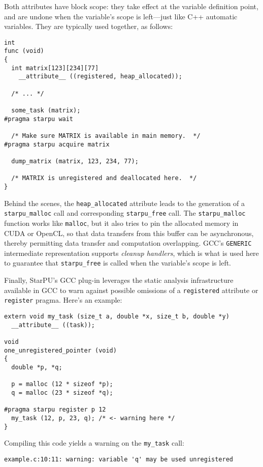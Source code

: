 \documentclass[twoside, a4paper, 10pt]{article}
\begin{document}
Both attributes have block scope: they take effect at the variable
definition point, and are undone when the variable's scope is
left---just like C++ automatic variables.  They are typically used
together, as follows:


\begin{verbatim}
int
func (void)
{
  int matrix[123][234][77]
    __attribute__ ((registered, heap_allocated));

  /* ... */

  some_task (matrix);
#pragma starpu wait

  /* Make sure MATRIX is available in main memory.  */
#pragma starpu acquire matrix

  dump_matrix (matrix, 123, 234, 77);

  /* MATRIX is unregistered and deallocated here.  */
}
\end{verbatim}

Behind the scenes, the \texttt{heap\_allocated} attribute leads to the
generation of a \texttt{starpu\_malloc} call and corresponding \texttt{starpu\_free}
call.  The \texttt{starpu\_malloc} function works like \texttt{malloc}, but it also
tries to pin the allocated memory in CUDA or OpenCL, so that data
transfers from this buffer can be asynchronous, thereby permitting
data transfer and computation overlapping.  GCC's \texttt{GENERIC} intermediate
representation supports \emph{cleanup handlers}, which is what is used here
to guarantee that \texttt{starpu\_free} is called when the variable's scope is
left.

Finally, StarPU's GCC plug-in leverages the static analysis
infrastructure available in GCC to warn against possible omissions of a
\texttt{registered} attribute or \texttt{register} pragma.  Here's an example:


\begin{verbatim}
extern void my_task (size_t a, double *x, size_t b, double *y)
  __attribute__ ((task));

void
one_unregistered_pointer (void)
{
  double *p, *q;

  p = malloc (12 * sizeof *p);
  q = malloc (23 * sizeof *q);

#pragma starpu register p 12
  my_task (12, p, 23, q); /* <- warning here */
}
\end{verbatim}

Compiling this code yields a warning on the \texttt{my\_task} call:


\begin{verbatim}
example.c:10:11: warning: variable 'q' may be used unregistered
\end{verbatim}
\end{document}
